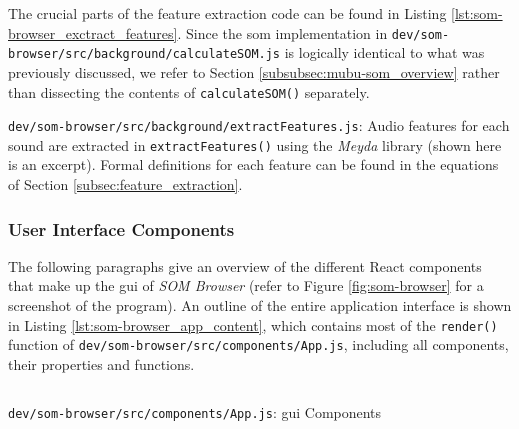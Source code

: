 \smallskip

The crucial parts of the feature extraction code can be found in Listing
\ref{lst:som-browser_exctract_features}. Since the \gls{som} implementation in
\texttt{dev/som-browser/src/background/calculateSOM.js} is logically identical
to what was previously discussed, we refer to Section
\ref{subsubsec:mubu-som_overview} rather than dissecting the contents of
\texttt{calculateSOM()} separately.

\begin{listing}[!htb]
  \caption[\texttt{dev/som-browser/src/background/extractFeatures.js}: Audio feature
  extraction]
  {\texttt{dev/som-browser/src/background/extractFeatures.js}: Audio features
  for each sound are extracted in \texttt{extractFeatures()} using the
  \textit{Meyda} library (shown here is an excerpt). Formal definitions for each
  feature can be found in the equations of Section
\ref{subsec:feature_extraction}.}
  \label{lst:som-browser_exctract_features}
\end{listing}

\pagebreak

\subsubsection{User Interface Components}
\label{subsubsec:som-browser_components}
The following paragraphs give an overview of the different React components
that make up the \gls{gui} of \textit{SOM Browser} (refer to Figure
\ref{fig:som-browser} for a screenshot of the program). An outline of the entire
application interface is shown in Listing \ref{lst:som-browser_app_content},
which contains most of the \texttt{render()} function of
\texttt{dev/som-browser/src/components/App.js}, including all components, their
properties and functions.

\begin{listing}[!p]
  \begin{mdframed}
    \inputminted[numbers=left, firstline=405, lastline=461,
    fontsize=\scriptsize]{jsx}{../dev/som-browser/src/components/App.js}
  \end{mdframed}
  \caption{\texttt{dev/som-browser/src/components/App.js}: \gls{gui} Components}
  \label{lst:som-browser_app_content}
\end{listing}

